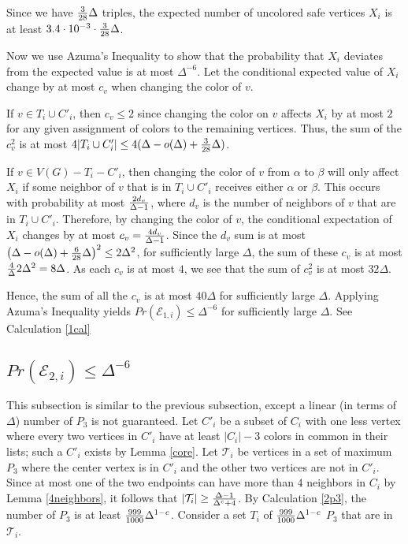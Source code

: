 \documentclass[12pt]{article}
\theoremstyle{definition}
\begin{document}
Since we have ${3\over 28}\Delta$ triples, the expected number of uncolored safe vertices $X_i$ is at least $3.4\cdot 10^{-3}\cdot {3\over 28}\Delta$. 

Now we use Azuma's Inequality to show that the probability that $X_i$ deviates from the expected value is at most $\Delta^{-6}$. 
Let the conditional expected value of $X_i$ change by at most $c_v$ when changing the color of $v$. 

If $v\in T_i\cup C'_i$, then $c_v\leq 2$ since changing the color on $v$ affects $X_i$ by at most $2$ for any given assignment of colors to the remaining vertices.
Thus, the sum of the $c_v^2$ is at most $4|{T}_i\cup C'_i|\leq 4(\Delta-o(\Delta)+{3\over 28}\Delta)$.

If $v\in V(G)-T_i-C'_i$, then changing the color of $v$ from $\alpha$ to $\beta$ will only affect $X_i$ if some neighbor of $v$ that is in $T_i\cup C'_i$ receives either $\alpha$ or $\beta$. 
This occurs with probability at most ${2d_v\over \Delta-1}$, where $d_v$ is the number of neighbors of $v$ that are in $T_i\cup C'_i$. 
Therefore, by changing the color of $v$, the conditional expectation of $X_i$ changes by at most $c_v={4d_v\over \Delta-1}$. 
Since the $d_v$ sum is at most $\left(\Delta-o(\Delta)+{6\over 28}\Delta\right)^2\leq 2\Delta^2$, for sufficiently large $\Delta$, the sum of these $c_v$ is at most ${4\over \Delta}{2\Delta^2}=8\Delta$. 
As each $c_v$ is at most $4$, we see that the sum of $c_v^2$ is at most $32\Delta$.

Hence, the sum of all the $c_v$ is at most $40\Delta$ for sufficiently large $\Delta$. Applying Azuma's Inequality yields $Pr(\mathcal{E}_{1, i})\leq \Delta^{-6}$ for sufficiently large $\Delta$. See Calculation \ref{1cal}

\subsection{$Pr(\mathcal{E}_{2,i})\leq \Delta^{-6}$}

This subsection is similar to the previous subsection, except a linear (in terms of $\Delta$) number of $P_3$ is not guaranteed. 
Let $C'_i$ be a subset of $C_i$ with one less vertex where every two vertices in $C'_i$ have at least $|C_i|-3$ colors in common in their lists;
such a $C'_i$ exists by Lemma \ref{core}. 
Let $\mathcal{T}_i$ be vertices in a set of maximum $P_3$ where the center vertex is in $C'_i$ and the other two vertices are not in $C'_i$. 
Since at most one of the two endpoints can have more than $4$ neighbors in $C_i$ by Lemma \ref{4neighbors}, it follows that ${|\mathcal{T}_i|}\geq {\Delta-1\over \Delta^c+4}$. 
By Calculation \ref{2p3}, the number of $P_3$ is at least ${999\over 1000}\Delta^{1-c}$.
Consider a set $T_i$ of ${999\over 1000}\Delta^{1-c}$ $P_3$ that are in $\mathcal{T}_i$.
\end{document}
